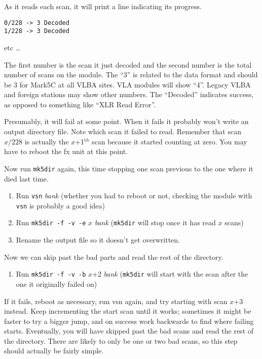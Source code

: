 As it reads each scan, it will print a line indicating its progress.

\noindent
{\tt 0/228 -> 3 Decoded} \\
{\tt 1/228 -> 3 Decoded} 

etc \ldots

The first number is the scan it just decoded and the second number is the total number of scans on the module.
The ``3'' is related to the data format and should be 3 for Mark5C at all VLBA sites.
VLA modules will show ``4''.
Legacy VLBA and foreign stations may show other numbers.
The ``Decoded'' indicates success, as opposed to something like ``XLR Read Error''.

Presumably, it will fail at some point.
When it fails it probably won't write an output directory file.
Note which scan it failed to read. Remember that scan $x/228$ is actually the $x$+1$^{\mathrm th}$ scan because it started counting at zero.
You may have to reboot the fx unit at this point.

Now run {\tt mk5dir} again, this time stopping one scan previous to the one where it died last time.

\begin{enumerate}
\item Run {\tt vsn} {\em bank} (whether you had to reboot or not, checking the module with {\tt vsn} is probably a good idea)
\item Run {\tt mk5dir -f -v -e} $x$ {\em bank} ({\tt mk5dir} will stop once it has read $x$ scans)
\item Rename the output file so it doesn't get overwritten.
\end{enumerate}

Now we can skip past the bad parts and read the rest of the directory.

\begin{enumerate}
\item Run {\tt mk5dir -f -v -b} $x$+2 {\em bank} ({\tt mk5dir} will start with the scan after the one it originally failed on)
\end{enumerate}

If it fails, reboot as necessary, run vsn again, and try starting with scan $x$+3 instead.
Keep incrementing the start scan until it works; sometimes it might be faster to try a bigger jump, and on success work backwards to find where failing starts.
Eventually, you will have skipped past the bad scans and read the rest of the directory.
There are likely to only be one or two bad scans, so this step should actually be fairly simple.

